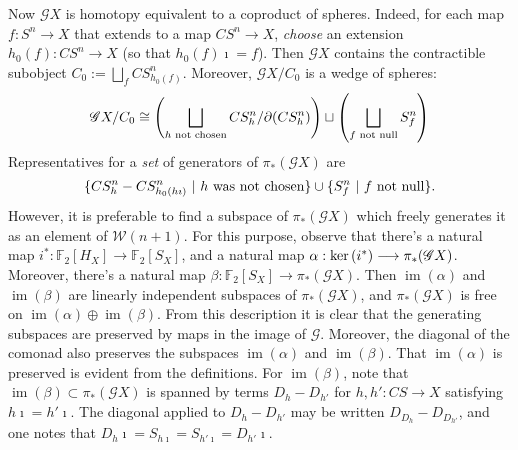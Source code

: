 \documentclass[11pt]{amsart}
\theoremstyle{plain}
\theoremstyle{definition}
\renewcommand{\ker}{\textup{ker}\,}
\DeclareMathOperator{\im}{im}
\renewcommand{\to}{\longrightarrow}
\newcommand{\scrG}{\mathscr{G}}
\newcommand{\calW}{\mathcal{W}}
\theoremstyle{plain}
\newcommand{\BSW}{{\scrG}}
\newcommand{\F}{\mathbb{F}}
\begin{document}
\begin{comp func sseq old version}
Now $\BSW X$ is homotopy equivalent to a coproduct of spheres. Indeed, for each map $f:S^n\to X$ that extends to a map $CS^n\to X$, \emph{choose} an extension $h_0(f):CS^n\to X$ (so that $h_0(f)\imath=f$). Then $\BSW X$ contains the contractible subobject $C_0:=\bigsqcup_f CS^n_{h_0(f)}$. Moreover, $\BSW X/C_0$ is a wedge of spheres:
\[\BSW X/C_0\cong \left(\bigsqcup_{h\textup{ not chosen}}CS^n_h/\partial(CS^n_h)\right) \sqcup\left(\bigsqcup_{f\textup{ not null}}S^n_f\right)\]
Representatives for a \emph{set} of generators of $\pi_*(\BSW X)$ are 
\[\{CS^n_h-CS^n_{h_0(h\imath)}\ |\ \textup{$h$ was not chosen}\}\cup\{S^n_f\ |\ \textup{$f$ not null}\}.\]
However, it is preferable to find a subspace of $\pi_*(\BSW X)$ which freely generates it as an element of $\calW(n+1)$.
For this purpose, observe that there's a natural map $i^*:\F_2[H_X]\to \F_2[S_X]$, and a natural map $\alpha:\ker(i^*)\to\pi_*(\BSW X)$. Moreover, there's a natural map $\beta:\F_2[S_X]\to\pi_*(\BSW X)$. Then $\im (\alpha)$ and $\im (\beta)$ are linearly independent subspaces of $\pi_*(\BSW X)$, and $\pi_*(\BSW X)$ is free on $\im (\alpha)\oplus\im (\beta)$. From this description it is clear that the generating subspaces are preserved by maps in the image of $\BSW $. Moreover, the diagonal of the comonad also preserves the subspaces $\im (\alpha)$ and $\im (\beta)$. That $\im (\alpha)$ is preserved is evident from the definitions. For $\im (\beta)$, note that $\im (\beta)\subset\pi_*(\BSW X)$ is spanned by terms $D_h-D_{h'}$ for $h,h':CS\to X$ satisfying $h\imath=h'\imath$. The diagonal applied to $D_h-D_{h'}$ may be written $D_{D_h}-D_{D_{h'}}$, and one notes that $D_h\imath=S_{h\imath}=S_{h'\imath}=D_{h'}\imath$.


\end{comp func sseq old version}
\end{document}

